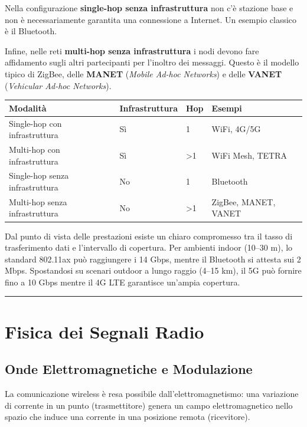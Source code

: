 \documentclass[
  italian,
  openany]{book}
\newcounter{none} %
\begin{document}
Nella configurazione \textbf{single-hop senza infrastruttura} non c'è
stazione base e non è necessariamente garantita una connessione a
Internet. Un esempio classico è il Bluetooth.

Infine, nelle reti \textbf{multi-hop senza infrastruttura} i nodi devono
fare affidamento sugli altri partecipanti per l'inoltro dei messaggi.
Questo è il modello tipico di ZigBee, delle \textbf{MANET} (\emph{Mobile
Ad-hoc Networks}) e delle \textbf{VANET} (\emph{Vehicular Ad-hoc
Networks}).

{\def\LTcaptype{none} %
\begin{longtable}[]{@{}llll@{}}
\toprule\noalign{}
Modalità & Infrastruttura & Hop & Esempi \\
\midrule\noalign{}
\endhead
\bottomrule\noalign{}
\endlastfoot
Single-hop con infrastruttura & Sì & 1 & WiFi, 4G/5G \\
Multi-hop con infrastruttura & Sì & \textgreater1 & WiFi Mesh, TETRA \\
Single-hop senza infrastruttura & No & 1 & Bluetooth \\
Multi-hop senza infrastruttura & No & \textgreater1 & ZigBee, MANET,
VANET \\
\end{longtable}
}

Dal punto di vista delle prestazioni esiste un chiaro compromesso tra il
tasso di trasferimento dati e l'intervallo di copertura. Per ambienti
indoor (10--30 m), lo standard 802.11ax può raggiungere i 14 Gbps,
mentre il Bluetooth si attesta sui 2 Mbps. Spostandosi su scenari
outdoor a lungo raggio (4--15 km), il 5G può fornire fino a 10 Gbps
mentre il 4G LTE garantisce un'ampia copertura.

\begin{center}\rule{0.5\linewidth}{0.5pt}\end{center}

\section{Fisica dei Segnali Radio}\label{fisica-dei-segnali-radio}

\subsection{Onde Elettromagnetiche e
Modulazione}\label{onde-elettromagnetiche-e-modulazione}

La comunicazione wireless è resa possibile dall'elettromagnetismo: una
variazione di corrente in un punto (trasmettitore) genera un campo
elettromagnetico nello spazio che induce una corrente in una posizione
remota (ricevitore).
\end{document}
